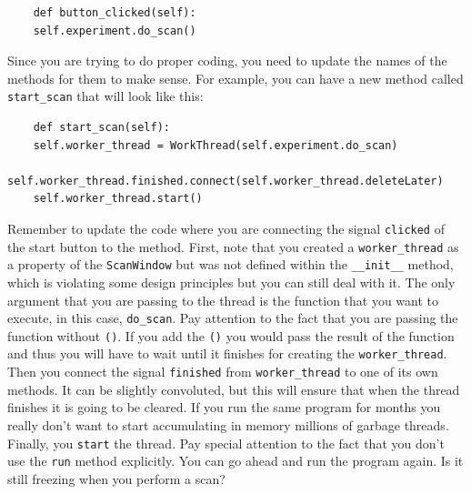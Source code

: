\begin{verbatim}
    def button_clicked(self):
    self.experiment.do_scan()
\end{verbatim}

Since you are trying to do proper coding, you need to update the names
of the methods for them to make sense. For example, you can have a new
method called \texttt{start_scan} that will look like this:

\begin{verbatim}
    def start_scan(self):
    self.worker_thread = WorkThread(self.experiment.do_scan)
    self.worker_thread.finished.connect(self.worker_thread.deleteLater)
    self.worker_thread.start()
\end{verbatim}

Remember to update the code where you are connecting the signal
\texttt{clicked} of the start button to the method. First, note that you
created a \texttt{worker_thread} as a property of the
\texttt{ScanWindow} but was not defined within the \texttt{__init__}
method, which is violating some design principles but you can still deal
with it. The only argument that you are passing to the thread is the
function that you want to execute, in this case, \texttt{do_scan}. Pay
attention to the fact that you are passing the function without
\texttt{()}. If you add the \texttt{()} you would pass the result of the
function and thus you will have to wait until it finishes for creating
the \texttt{worker\_thread}. Then you connect the signal
\texttt{finished} from \texttt{worker_thread} to one of its own
methods. It can be slightly convoluted, but this will ensure that when
the thread finishes it is going to be cleared. If you run the same
program for months you really don't want to start accumulating in memory
millions of garbage threads. Finally, you \texttt{start} the thread. Pay
special attention to the fact that you don't use the \texttt{run} method
explicitly. You can go ahead and run the program again. Is it still
freezing when you perform a scan?



